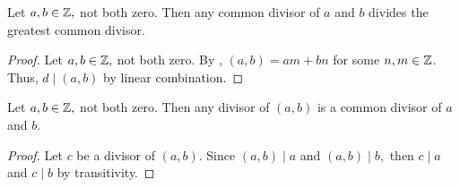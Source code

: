 \documentclass{../ximera}
\begin{document}
\begin{lemma}\label{lem:gcd_mult}
	Let $a,b\in\mathbb Z,$ not both zero. Then any  common divisor of $a$ and $b$ divides the greatest common divisor.

 	\begin{proof}
 		Let $a,b\in\mathbb Z,$ not both zero. By , $(a,b)=am+bn$ for some $n,m\in\mathbb Z$. Thus, $d\mid (a,b)$ by linear combination.
 	\end{proof}
\end{lemma}


\begin{lemma}\label{lem:gcd_trans}
 	Let $a,b\in\mathbb Z,$ not both zero. Then any divisor of $(a,b)$ is a common divisor of $a$ and $b$.

	\begin{proof}
 		Let $c$ be a divisor of $(a,b)$. Since $(a,b)\mid a$ and $(a,b )\mid b,$ then $c\mid a$ and $c\mid b$ by transitivity.
	\end{proof}
\end{lemma}

\end{document}
